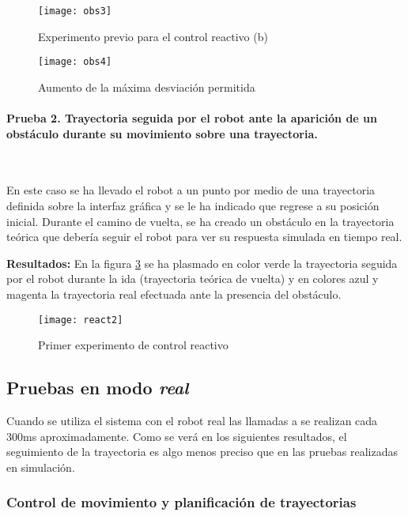 \begin{figure}[h]
  \centering\texttt{[image: obs3]}
  \caption{Experimento previo para el control reactivo (b)}\label{fg:react1b}
\end{figure}


\begin{figure}[h]
  \centering\texttt{[image: obs4]}\\
  \caption{Aumento de la máxima desviación permitida}\label{fg:react2}
\end{figure}

\clearpage

\paragraph{Prueba 2. Trayectoria seguida por el robot ante la aparición de un obstáculo durante su movimiento sobre una trayectoria.}\ %

\noindent
En este caso se ha llevado el robot a un punto por medio de una trayectoria definida sobre la interfaz gráfica y se le ha indicado que regrese a su posición inicial. Durante el camino de vuelta, se ha creado un obstáculo en la trayectoria teórica que debería seguir el robot para ver su respuesta simulada en tiempo real.

\textbf{Resultados:}
En la figura \ref{fg:react3} se ha plasmado en color verde la trayectoria seguida por el robot durante la ida (trayectoria teórica de vuelta) y en colores azul y magenta la trayectoria real efectuada ante la presencia del obstáculo.
\begin{figure}[h]
  \centering\texttt{[image: react2]}\\
  \caption{Primer experimento de control reactivo}\label{fg:react3}
\end{figure}

\clearpage

\subsection{Pruebas en modo \emph{real}}
Cuando se utiliza el sistema con el robot real las llamadas a  se realizan cada 300ms aproximadamente. Como se verá en los siguientes resultados, el seguimiento de la trayectoria es algo menos preciso que en las pruebas realizadas en simulación.

\subsubsection{Control de movimiento y planificación de trayectorias}

